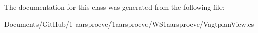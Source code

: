 The documentation for this class was generated from the following file\+:\begin{DoxyCompactItemize}
\item 
Documents/\+Git\+Hub/1-\/aarsproeve/1aarsproeve/\+W\+S1aarsproeve/Vagtplan\+View.\+cs\end{DoxyCompactItemize}
